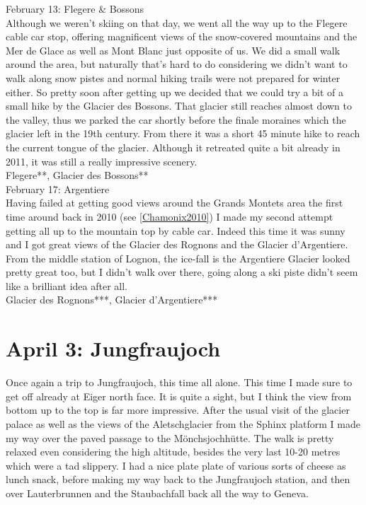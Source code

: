 February 13: Flegere \& Bossons\\
Although we weren't skiing on that day, we went all the way up to the Flegere cable car stop, offering magnificent views of the snow-covered mountains and the Mer de Glace as well as Mont Blanc just opposite of us. We did a small walk around the area, but naturally that's hard to do considering we didn't want to walk along snow pistes and normal hiking trails were not prepared for winter either. So pretty soon after getting up we decided that we could try a bit of a small hike by the Glacier des Bossons. That glacier still reaches almost down to the valley, thus we parked the car shortly before the finale moraines which the glacier left in the 19th century. From there it was a short 45 minute hike to reach the current tongue of the glacier. Although it retreated quite a bit already in 2011, it was still a really impressive scenery.\\

Flegere**, Glacier des Bossons**\\

February 17: Argentiere\\
Having failed at getting good views around the Grands Montets area the first time around back in 2010 (see \ref{Chamonix2010}) I made my second attempt getting all up to the mountain top by cable car. Indeed this time it was sunny and I got great views of the Glacier des Rognons and the Glacier d'Argentiere. From the middle station of Lognon, the ice-fall is the Argentiere Glacier looked pretty great too, but I didn't walk over there, going along a ski piste didn't seem like a brilliant idea after all.\\

Glacier des Rognons***, Glacier d'Argentiere***\\

\section{April 3: Jungfraujoch}
\label{Jungfrau2011}

Once again a trip to Jungfraujoch, this time all alone. This time I made sure to get off already at Eiger north face. It is quite a sight, but I think the view from bottom up to the top is far more impressive. After the usual visit of the glacier palace as well as the views of the Aletschglacier from the Sphinx platform I made my way over the paved passage to the M\"onchsjochh\"utte. The walk is pretty relaxed even considering the high altitude, besides the very last 10-20 metres which were a tad slippery. I had a nice plate plate of various sorts of cheese as lunch snack, before making my way back to the Jungfraujoch station, and then over Lauterbrunnen and the Staubachfall back all the way to Geneva.\\

